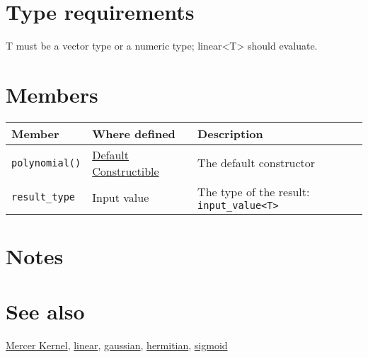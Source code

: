 \documentclass{article}
\begin{document}
\section*{Type requirements}

T must be a vector type or a numeric type; linear<T> should evaluate.


\section*{Members}

\begin{tabular}{lll}
\textbf{Member} & \textbf{Where defined} & \textbf{Description} \\ 
\hline
\texttt{polynomial()} & \href{http://www.sgi.com/tech/stl/DefaultConstructible.html}{Default Constructible} & The default constructor \\
\texttt{result_type} & Input value & The type of the result: \texttt{input_value<T>} \\
\end{tabular}

\section*{Notes}

\section*{See also}

\href{\kmlroot/reference/mercer_kernel.html}{Mercer Kernel},
\href{\kmlroot/reference/linear.html}{linear}, 
\href{\kmlroot/reference/gaussian.html}{gaussian}, 
\href{\kmlroot/reference/hermitian.html}{hermitian}, 
\href{\kmlroot/reference/sigmoid.html}{sigmoid}



\end{document}
